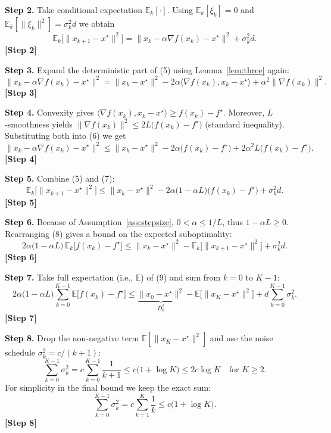 \documentclass{article}
\begin{document}
\noindent\textbf{Step 2.}  Take conditional expectation $\mathbb{E}_k[\cdot]$. Using $\mathbb{E}_k[\xi_k]=0$ and $\mathbb{E}_k[\|\xi_k\|^2]=\sigma_k^2 d$ we obtain
\[
\mathbb{E}_k\!\bigl[\|x_{k+1}-x^\star\|^2\bigr]
 = \|x_k-\alpha\nabla f(x_k)-x^\star\|^2 + \sigma_k^2 d .
\tag{5}
\]
\textbf{[Step 2]}

\noindent\textbf{Step 3.}  Expand the deterministic part of (5) using Lemma~\ref{lem:three} again:
\[
\|x_k-\alpha\nabla f(x_k)-x^\star\|^2
 = \|x_k-x^\star\|^2 -2\alpha\langle\nabla f(x_k),x_k-x^\star\rangle+\alpha^2\|\nabla f(x_k)\|^2 .
\tag{6}
\]
\textbf{[Step 3]}

\noindent\textbf{Step 4.}  Convexity gives $\langle\nabla f(x_k),x_k-x^\star\rangle \ge f(x_k)-f^\star$. Moreover, $L$‑smoothness yields $\|\nabla f(x_k)\|^2 \le 2L\bigl(f(x_k)-f^\star\bigr)$ (standard inequality). Substituting both into (6) we get
\[
\|x_k-\alpha\nabla f(x_k)-x^\star\|^2
 \le \|x_k-x^\star\|^2 -2\alpha\bigl(f(x_k)-f^\star\bigr)+2\alpha^2 L\bigl(f(x_k)-f^\star\bigr).
\tag{7}
\]
\textbf{[Step 4]}

\noindent\textbf{Step 5.}  Combine (5) and (7):
\[
\mathbb{E}_k\!\bigl[\|x_{k+1}-x^\star\|^2\bigr]
 \le \|x_k-x^\star\|^2 -2\alpha\bigl(1-\alpha L\bigr)\bigl(f(x_k)-f^\star\bigr) + \sigma_k^2 d .
\tag{8}
\]
\textbf{[Step 5]}

\noindent\textbf{Step 6.}  Because of Assumption~\ref{ass:stepsize}, $0<\alpha\le 1/L$, thus $1-\alpha L\ge 0$. Rearranging (8) gives a bound on the expected suboptimality:
\[
2\alpha\bigl(1-\alpha L\bigr)\,\mathbb{E}_k\!\bigl[f(x_k)-f^\star\bigr]
 \le \|x_k-x^\star\|^2 - \mathbb{E}_k\!\bigl[\|x_{k+1}-x^\star\|^2\bigr] + \sigma_k^2 d .
\tag{9}
\]
\textbf{[Step 6]}

\noindent\textbf{Step 7.}  Take full expectation (i.e., $\mathbb{E}$) of (9) and sum from $k=0$ to $K-1$:
\[
2\alpha\bigl(1-\alpha L\bigr)\sum_{k=0}^{K-1}\mathbb{E}\!\bigl[f(x_k)-f^\star\bigr]
 \le \underbrace{\|x_0-x^\star\|^2}_{D_0^2}
      -\mathbb{E}\!\bigl[\|x_{K}-x^\star\|^2\bigr]
      + d\sum_{k=0}^{K-1}\sigma_k^2 .
\tag{10}
\]
\textbf{[Step 7]}

\noindent\textbf{Step 8.}  Drop the non‑negative term $\mathbb{E}[\|x_{K}-x^\star\|^2]$ and use the noise schedule $\sigma_k^2=c/(k+1)$:
\[
\sum_{k=0}^{K-1}\sigma_k^2 = c\sum_{k=0}^{K-1}\frac{1}{k+1}
 \le c\bigl(1+\log K\bigr) \le 2c\log K \quad\text{for }K\ge 2 .
\tag{11}
\]
For simplicity in the final bound we keep the exact sum:
\[
\sum_{k=0}^{K-1}\sigma_k^2 = c\sum_{k=1}^{K}\frac{1}{k}\le c\bigl(1+\log K\bigr).
\tag{12}
\]
\textbf{[Step 8]}
\end{document}
